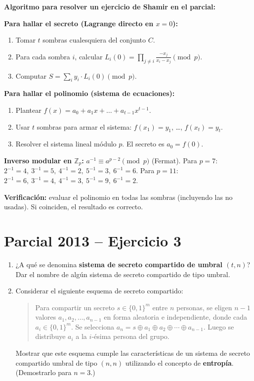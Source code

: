 \documentclass[11pt,a4paper]{article}
\begin{document}
\begin{tipsbox}
\textbf{Algoritmo para resolver un ejercicio de Shamir en el parcial:}

\medskip
\textbf{Para hallar el secreto (Lagrange directo en $x=0$):}
\begin{enumerate}
  \item Tomar $t$ sombras cualesquiera del conjunto $C$.
  \item Para cada sombra $i$, calcular $L_i(0) = \prod_{j \neq i} \frac{-x_j}{x_i - x_j} \pmod{p}$.
  \item Computar $S = \sum_i y_i \cdot L_i(0) \pmod{p}$.
\end{enumerate}

\textbf{Para hallar el polinomio (sistema de ecuaciones):}
\begin{enumerate}
  \item Plantear $f(x) = a_0 + a_1 x + \dots + a_{t-1} x^{t-1}$.
  \item Usar $t$ sombras para armar el sistema: $f(x_1) = y_1$, \dots, $f(x_t) = y_t$.
  \item Resolver el sistema lineal módulo $p$. El secreto es $a_0 = f(0)$.
\end{enumerate}

\textbf{Inverso modular en $\mathbb{Z}_p$:} $a^{-1} \equiv a^{p-2} \pmod{p}$ (Fermat). Para $p=7$: $2^{-1}=4,\ 3^{-1}=5,\ 4^{-1}=2,\ 5^{-1}=3,\ 6^{-1}=6$. Para $p=11$: $2^{-1}=6,\ 3^{-1}=4,\ 4^{-1}=3,\ 5^{-1}=9,\ 6^{-1}=2$.

\textbf{Verificación:} evaluar el polinomio en todas las sombras (incluyendo las no usadas). Si coinciden, el resultado es correcto.
\end{tipsbox}

\section{Parcial 2013 -- Ejercicio 3}
\label{sec:2013}

\begin{consignabox}
\begin{enumerate}
  \item ¿A qué se denomina \textbf{sistema de secreto compartido de umbral $(t,n)$}? Dar el nombre de algún sistema de secreto compartido de tipo umbral.
  \item Considerar el siguiente esquema de secreto compartido:
  \begin{quote}
  Para compartir un secreto $s \in \{0,1\}^m$ entre $n$ personas, se eligen $n-1$ valores $a_1, a_2, \ldots, a_{n-1}$ en forma aleatoria e independiente, donde cada $a_i \in \{0,1\}^m$. Se selecciona $a_n = s \oplus a_1 \oplus a_2 \oplus \cdots \oplus a_{n-1}$. Luego se distribuye $a_i$ a la $i$-ésima persona del grupo.
  \end{quote}
  Mostrar que este esquema cumple las características de un sistema de secreto compartido umbral de tipo $(n,n)$ utilizando el concepto de \textbf{entropía}. (Demostrarlo para $n = 3$.)
\end{enumerate}
\end{consignabox}
\end{document}
